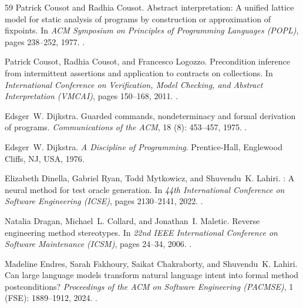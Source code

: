 \documentclass[11pt]{article}
\begin{document}
\begin{thebibliography}{59}
Patrick Cousot and Radhia Cousot.
\newblock Abstract interpretation: A unified lattice model for static analysis
  of programs by construction or approximation of fixpoints.
\newblock In \emph{ACM Symposium on Principles of Programming Languages
  (POPL)}, pages 238--252, 1977.
\newblock {}.

Patrick Cousot, Radhia Cousot, and Francesco Logozzo.
\newblock Precondition inference from intermittent assertions and application
  to contracts on collections.
\newblock In \emph{International Conference on Verification, Model Checking,
  and Abstract Interpretation (VMCAI)}, pages 150--168, 2011.
\newblock {}.

Edsger~W. Dijkstra.
\newblock Guarded commands, nondeterminacy and formal derivation of programs.
\newblock \emph{Communications of the ACM}, 18 (8): 453--457,
  1975.
\newblock {}.

Edsger~W. Dijkstra.
\newblock \emph{A Discipline of Programming}.
\newblock Prentice-Hall, Englewood Cliffs, NJ, USA, 1976.

Elizabeth Dinella, Gabriel Ryan, Todd Mytkowicz, and Shuvendu~K. Lahiri.
: A neural method for test oracle generation.
\newblock In \emph{44th International Conference on Software Engineering
  (ICSE)}, pages 2130--2141, 2022.
\newblock {}.

Natalia Dragan, Michael~L. Collard, and Jonathan~I. Maletic.
\newblock Reverse engineering method stereotypes.
\newblock In \emph{22nd IEEE International Conference on Software Maintenance
  (ICSM)}, pages 24--34, 2006.
\newblock {}.

Madeline Endres, Sarah Fakhoury, Saikat Chakraborty, and Shuvendu~K. Lahiri.
\newblock Can large language models transform natural language intent into
  formal method postconditions?
\newblock \emph{Proceedings of the ACM on Software Engineering (PACMSE)},
  1 (FSE): 1889--1912, 2024.
\newblock {}.


\end{thebibliography}
\end{document}

